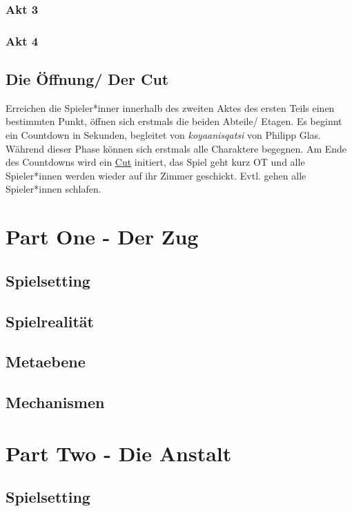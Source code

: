 \documentclass[a4paper, 12pt]{scrartcl}
\begin{document}
    \subsubsection{Akt 3}
    \subsubsection{Akt 4}
   
    \subsection{Die Öffnung/ Der Cut}
    Erreichen die Spieler*inner innerhalb des zweiten Aktes des ersten Teils einen bestimmten Punkt, öffnen sich erstmals die beiden Abteile/ Etagen. 
    Es beginnt ein Countdown in Sekunden, begleitet von \textit{koyaanisqatsi} von Philipp Glas. 
    Während dieser Phase können sich erstmals alle Charaktere begegnen. 
    Am Ende des Countdowns wird ein \hyperref[cut]{Cut} initiert, das Spiel geht kurz OT und alle Spieler*innen werden wieder auf ihr Zimmer geschickt. 
    Evtl. gehen alle Spieler*innen schlafen.  

    \section{Part One - Der Zug}
    \subsection{Spielsetting}
    \subsection{Spielrealität}
    \subsection{Metaebene}
    \subsection{Mechanismen}

    \section{Part Two - Die Anstalt}
    \subsection{Spielsetting}
\end{document}
